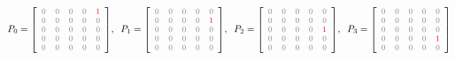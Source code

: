 \begin{equation*}
P_{0} = \textnormal{\footnotesize$\left[{\color{gray}
	\begin{array}{rrrrr}
	0 & 0 & 0 & 0 & {\color{red}1} \\
	0 & 0 & 0 & 0 & 0 \\
	0 & 0 & 0 & 0 & 0 \\
	0 & 0 & 0 & 0 & 0 \\
	0 & 0 & 0 & 0 & 0 \\
	\end{array}
	}\right]$},
\;\;
P_{1} = \textnormal{\footnotesize$\left[{\color{gray}
	\begin{array}{rrrrr}
	0 & 0 & 0 & 0 & 0 \\
	0 & 0 & 0 & 0 & {\color{red}1} \\
	0 & 0 & 0 & 0 & 0 \\
	0 & 0 & 0 & 0 & 0 \\
	0 & 0 & 0 & 0 & 0 \\
	\end{array}
	}\right]$},
\;\;
P_{2} = \textnormal{\footnotesize$\left[{\color{gray}
	\begin{array}{rrrrr}
	0 & 0 & 0 & 0 & 0 \\
	0 & 0 & 0 & 0 & 0 \\
	0 & 0 & 0 & 0 & {\color{red}1} \\
	0 & 0 & 0 & 0 & 0 \\
	0 & 0 & 0 & 0 & 0 \\
	\end{array}
	}\right]$},
\;\;
P_{3} = \textnormal{\footnotesize$\left[{\color{gray}
	\begin{array}{rrrrr}
	0 & 0 & 0 & 0 & 0 \\
	0 & 0 & 0 & 0 & 0 \\
	0 & 0 & 0 & 0 & 0 \\
	0 & 0 & 0 & 0 & {\color{red}1} \\
	0 & 0 & 0 & 0 & 0 \\
	\end{array}
	}\right]$}
\end{equation*}

